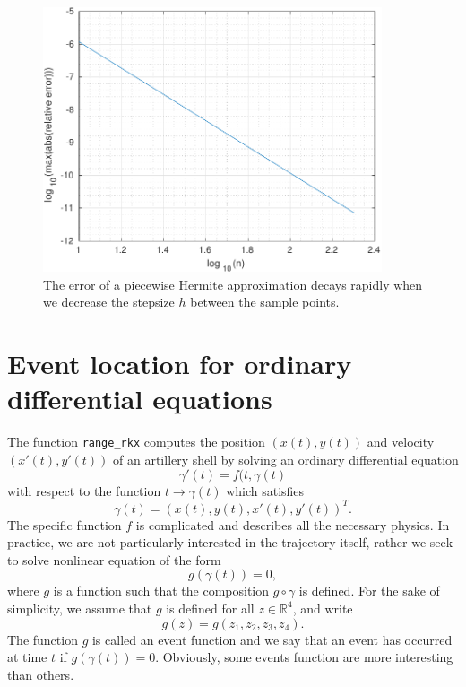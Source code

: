 \documentclass[a4paper,12pt]{article}
\newcommand{\R}{\mathbb{R}}
\newcommand{\bes}{\begin{equation*}}
\newcommand{\ees}{\end{equation*}}
\begin{document}
 \begin{figure}
    \centering
    \includegraphics[width=10cm]{MyPiecewiseHermite.pdf} \caption[The error of the piecewise Hermite approximation]{The error of a piecewise Hermite approximation decays rapidly when we decrease the stepsize $h$ between the sample points.} \label{fig:MyPiecewiseHermite}
    \end{figure}

 
   \section{Event location for ordinary differential equations}

   The function {\tt range\_rkx} computes the position $(x(t),y(t))$ and velocity $(x'(t),y'(t))$ of an artillery shell by solving an ordinary differential equation
   \bes
   \gamma'(t) = f(t,\gamma(t)
   \ees
   with respect to the function $t \rightarrow \gamma(t)$ which satisfies
   \bes
   \gamma(t) = (x(t), y(t), x'(t), y'(t))^T.
   \ees
   The specific function $f$ is complicated and describes all the necessary physics. In practice, we are not particularly interested in the trajectory itself, rather we seek to solve nonlinear equation of the form
   \bes
   g(\gamma(t)) = 0,
   \ees
   where $g$ is a function such that the composition $g \circ \gamma$ is defined. For the sake of simplicity, we assume that $g$ is defined for all $z \in \R^4$, and write
   \bes
   g(z) = g(z_1, z_2, z_3, z_4).
   \ees
   The function $g$ is called an event function and we say that an event has occurred at time $t$ if $g(\gamma(t)) = 0$. Obviously, some events function are more interesting than others.
   
\end{document}
